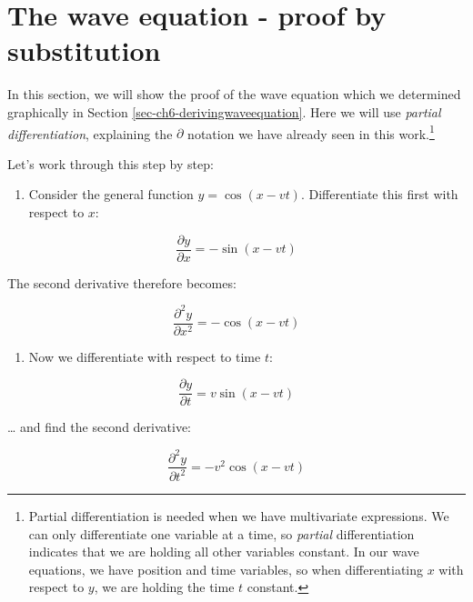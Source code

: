 \documentclass[
]{book}
\providecommand{\tightlist}{%
  \setlength{\itemsep}{0pt}\setlength{\parskip}{0pt}}
\begin{document}
\hypertarget{sec-ch6-waveequationproof2}{%
\section{The wave equation - proof by substitution}\label{sec-ch6-waveequationproof2}}

In this section, we will show the proof of the wave equation which we determined graphically in Section \ref{sec-ch6-derivingwaveequation}. Here we will use \emph{partial differentiation}, explaining the \(\partial\) notation we have already seen in this work.\footnote{Partial differentiation is needed when we have multivariate expressions. We can only differentiate one variable at a time, so \emph{partial} differentiation indicates that we are holding all other variables constant. In our wave equations, we have position and time variables, so when differentiating \(x\) with respect to \(y\), we are holding the time \(t\) constant.}

Let's work through this step by step:

\begin{enumerate}
\def\labelenumi{\arabic{enumi}.}
\tightlist
\item
  Consider the general function \(y = \cos(x - vt)\). Differentiate this first with respect to \(x\):
\end{enumerate}

\begin{equation}
\frac{\partial y}{\partial x} = -\sin(x - vt)
\end{equation}

The second derivative therefore becomes:

\begin{equation}
\frac{\partial^2 y}{\partial x^2} = -\cos(x - vt)
\label{eq:ch6-wavederivsubs1}
\end{equation}

\begin{enumerate}
\def\labelenumi{\arabic{enumi}.}
\setcounter{enumi}{1}
\tightlist
\item
  Now we differentiate with respect to time \(t\):
\end{enumerate}

\begin{equation}
\frac{\partial y}{\partial t} = v\sin(x - vt)
\end{equation}

\ldots{} and find the second derivative:

\begin{equation}
\frac{\partial^2 y}{\partial t^2} = -v^2 \cos(x - vt)
\label{eq:ch6-wavederivsubs2}
\end{equation}
\end{document}

